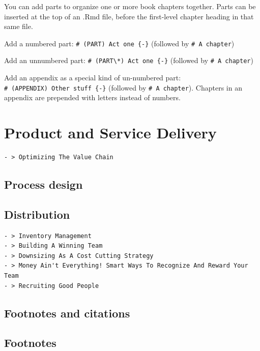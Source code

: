 \documentclass[
]{book}
\begin{document}
You can add parts to organize one or more book chapters together. Parts can be inserted at the top of an .Rmd file, before the first-level chapter heading in that same file.

Add a numbered part: \texttt{\#\ (PART)\ Act\ one\ \{-\}} (followed by \texttt{\#\ A\ chapter})

Add an unnumbered part: \texttt{\#\ (PART\textbackslash{}*)\ Act\ one\ \{-\}} (followed by \texttt{\#\ A\ chapter})

Add an appendix as a special kind of un-numbered part: \texttt{\#\ (APPENDIX)\ Other\ stuff\ \{-\}} (followed by \texttt{\#\ A\ chapter}). Chapters in an appendix are prepended with letters instead of numbers.

\hypertarget{product-and-service-delivery}{%
\chapter{Product and Service Delivery}\label{product-and-service-delivery}}

\begin{verbatim}
- > Optimizing The Value Chain
\end{verbatim}

\hypertarget{process-design}{%
\section{Process design}\label{process-design}}

\hypertarget{distribution}{%
\section{Distribution}\label{distribution}}

\begin{verbatim}
- > Inventory Management
- > Building A Winning Team
- > Downsizing As A Cost Cutting Strategy
- > Money Ain't Everything! Smart Ways To Recognize And Reward Your Team
- > Recruiting Good People
\end{verbatim}

\hypertarget{footnotes-and-citations}{%
\section{Footnotes and citations}\label{footnotes-and-citations}}

\hypertarget{footnotes}{%
\section{Footnotes}\label{footnotes}}
\end{document}
